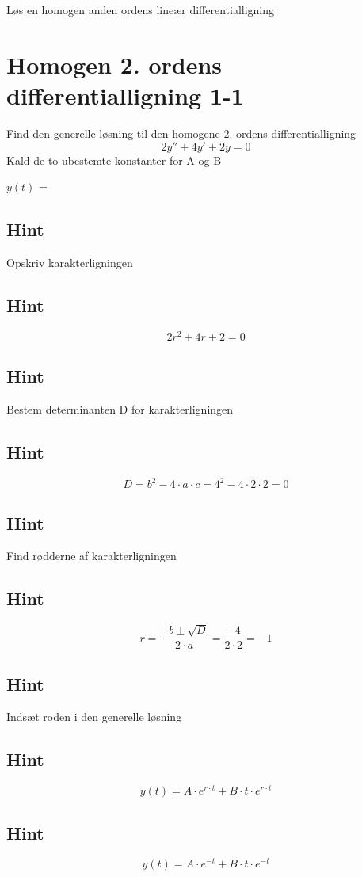 \documentclass{article}
\newenvironment{exercise}[1]{\newpage\section{#1}}{}
\newcommand{\answerbox}[1]{\fbox{$#1$}}
\newcommand{\hint}{\subsection*{Hint}}
\begin{document}
Løs en homogen anden ordens lineær differentialligning
\tableofcontents
\newpage


\begin{exercise}{Homogen 2. ordens differentialligning 1-1}

Find den generelle løsning til den homogene 2. ordens differentialligning
\[
2y'' + 4y' + 2y = 0
\]
Kald de to ubestemte konstanter for A og B

$y(t)$ = \answerbox{A \cdot e^{-t} + B \cdot t \cdot e^{-t}}


\hint 

Opskriv karakterligningen

\hint

\[
2 r^2 + 4r + 2 = 0
\]


\hint

Bestem determinanten D for karakterligningen


\hint 
\[
D = b^2 - 4 \cdot a \cdot c = 4^2 - 4 \cdot 2 \cdot 2  = 0
\]

\hint 
Find rødderne af karakterligningen


\hint

\[
r = \frac{-b \pm \sqrt{D}}{2 \cdot a} = \frac{-4}{2 \cdot 2} = -1
\]

\hint

Indsæt roden i den generelle løsning

\hint
\[
y(t) = A \cdot e^{r \cdot t} + B \cdot t \cdot e^{r \cdot t}
\]

\hint

\[
y(t) = A \cdot e^{-t} + B \cdot t \cdot e^{-t}
\]


\end{exercise}

\newpage
\end{document}
